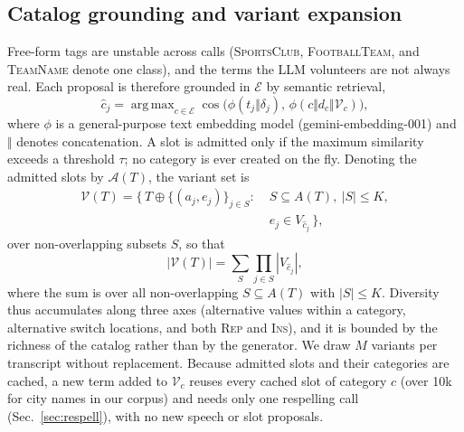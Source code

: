 \documentclass[letterpaper]{article}
\DeclareMathOperator*{\argmax}{arg\,max}
\newcommand{\cE}{\mathcal{E}}
\newcommand{\cV}{\mathcal{V}}
\newcommand{\cA}{\mathcal{A}}
\begin{document}
\subsection{Catalog grounding and variant expansion}
Free-form tags are unstable across calls (\textsc{SportsClub}, \textsc{FootballTeam}, and \textsc{TeamName} denote one class), and the terms the LLM volunteers are not always real. Each proposal is therefore grounded in $\cE$ by semantic retrieval,
\begin{equation}
  \hat c_j=\argmax_{c\in\cE}\cos\!\big(\phi(t_j\Vert\delta_j),\,\phi(c\Vert d_c\Vert\cV_c)\big),
  \label{eq:ground}
\end{equation}
where $\phi$ is a general-purpose text embedding model (gemini-embedding-001) and $\Vert$ denotes concatenation. A slot is admitted only if the maximum similarity exceeds a threshold $\tau$; no category is ever created on the fly. Denoting the admitted slots by $\cA(T)$, the variant set is
\begin{equation}
\begin{aligned}
\mathcal{V}(T)
= \{\,T \oplus \{(a_j,e_j)\}_{j\in S}:\;&
S \subseteq A(T),\ |S|\le K,\\
& e_j\in V_{\hat c_j}\,\},
\end{aligned}
\label{eq:variant}
\end{equation}
over non-overlapping subsets $S$, so that
\[
|\mathcal{V}(T)|
=
\sum_{S} \prod_{j\in S} |V_{\hat c_j}|,
\]
where the sum is over all non-overlapping $S\subseteq A(T)$ with $|S|\le K$.
Diversity thus accumulates along three axes (alternative values
within a category, alternative switch locations, and both \textsc{Rep} and \textsc{Ins}), and it is bounded by the richness of the catalog rather than by the generator. We draw $M$ variants per transcript without replacement. Because admitted slots and their categories are cached, a new term added to $\cV_c$ reuses every cached slot of category $c$ (over 10k for city names in our corpus) and needs only one respelling call (Sec.~\ref{sec:respell}), with no new speech or slot proposals.
\end{document}
